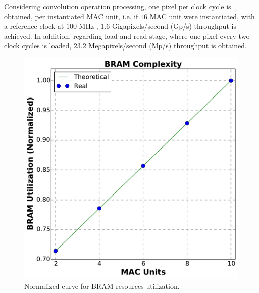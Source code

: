 \documentclass[conference,compsoc]{IEEEtran}
\begin{document}
Considering convolution operation processing, one pixel per clock cycle is
obtained, per instantiated MAC unit, i.e. if $16$ MAC unit were instantiated,
with a reference clock at $100$ MHz , $1.6$ Gigapixels/second (Gp/s) throughput
is achieved. In addition, regarding load and read stage, where one pixel every
two clock cycles is loaded, $23.2$ Megapixels/second (Mp/s) throughput is
obtained.

\begin{figure}[!t]
\centering
\includegraphics[scale=0.3]{BRAM_c2}
\caption{Normalized curve for BRAM resources utilization.}
\label{bram_n}
\end{figure}

%
%
\end{document}
